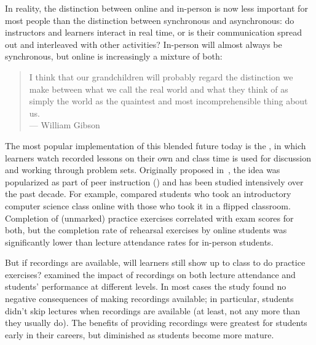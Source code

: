 In reality,
the distinction between online and in-person is now less important for most people
than the distinction between synchronous and asynchronous:
do instructors and learners interact in real time,
or is their communication spread out and interleaved with other activities?
In-person will almost always be synchronous,
but online is increasingly a mixture of both:

\begin{quote}

  I think that our grandchildren will probably regard the distinction we make
  between what we call the real world and what they think of as simply the world
  as the quaintest and most incomprehensible thing about us. \\
  --- William Gibson

\end{quote}

The most popular implementation of this blended future today
is the ,
in which learners watch recorded lessons on their own
and class time is used for discussion and working through problem sets.
Originally proposed in~\cite{King1993},
the idea was popularized as part of peer instruction ()
and has been studied intensively over the past decade.
For example,
\cite{Camp2016} compared students who took an introductory computer science class online
with those who took it in a flipped classroom.
Completion of (unmarked) practice exercises correlated with exam scores for both,
but the completion rate of rehearsal exercises by online students
was significantly lower than lecture attendance rates for in-person students.

But if recordings are available,
will learners still show up to class to do practice exercises?
\cite{Nord2017} examined the impact of recordings on both lecture attendance
and students' performance at different levels.
In most cases the study found no negative consequences of making recordings available;
in particular,
students didn't skip lectures when recordings are available
(at least, not any more than they usually do).
The benefits of providing recordings were greatest for students early in their careers,
but diminished as students become more mature.

